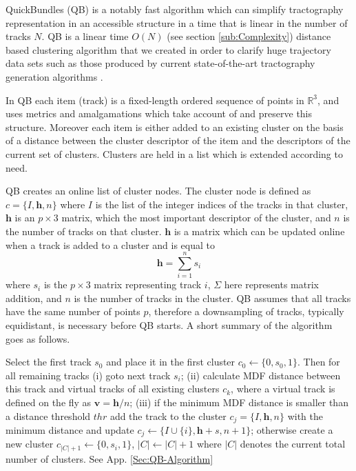 \documentclass[preprint,authoryear,a4paper,10pt,onecolumn]{elsarticle}
\begin{document}
QuickBundles (QB) is a notably fast algorithm which can simplify
tractography representation in an accessible structure in a time that is
linear in the number of tracks $N$. QB is a linear time $O(N)$ (see
section \ref{sub:Complexity}) distance based clustering algorithm that
we created in order to clarify huge trajectory data sets such as those
produced by current state-of-the-art tractography generation algorithms
\cite{Parker2003,WWS+08}. 

In QB each item (track) is a fixed-length
ordered sequence of points in $\mathbb{R}^{3}$, and uses metrics and
amalgamations which take account of and preserve this structure.
Moreover each item is either added to an existing cluster on the basis
of a distance between the cluster descriptor of the item and the
descriptors of the current set of clusters. Clusters are held in a list
which is extended according to need.

QB creates an online list of cluster nodes. The cluster node is defined
as $c=\{I,\mathbf{h},n\}$ where $I$ is the list of the integer indices
of the tracks in that cluster, $\mathbf{h}$ is an $p\times3$ matrix,
which the most important descriptor of the cluster, and $n$ is the
number of tracks on that cluster. $\mathbf{h}$ is a matrix which can be
updated online when a track is added to a cluster and is equal
to\begin{equation} \mathbf{h}=\sum_{i=1}^{n}s_{i}\end{equation} where
$s_{i}$ is the $p\times3$ matrix representing track $i$, $\Sigma$ here
represents matrix addition, and $n$ is the number of tracks in the
cluster. QB assumes that all tracks have the same number of points $p$,
therefore a downsampling of tracks, typically equidistant, is necessary
before QB starts. A short summary of the algorithm goes as follows.

Select the first track $s_{0}$ and place it in the first cluster
$c_{0}\leftarrow\{0,s_{0},1\}$. Then for all remaining tracks (i)
goto next track $s_{i}$; (ii) calculate MDF distance between this
track and virtual tracks of all existing clusters $c_{k}$, where
a virtual track is defined on the fly as $\mathbf{v}=\mathbf{h}/n$;
(iii) if the minimum MDF distance is smaller than a distance threshold
$\mathrm{\mathit{thr}}$ add the track to the cluster $c_{j}=\{I,\mathbf{h},n\}$
with the minimum distance and update $c_{j}\leftarrow\{I\cup\{i\},\mathbf{h}+s,n+1\}$;
otherwise create a new cluster $c_{|C|+1}\leftarrow\{0,s_{i},1\}$,
$|C|\leftarrow|C|+1$ where $|C|$ denotes the current total number
of clusters. See App. \ref{Sec:QB-Algorithm}
\end{document}
